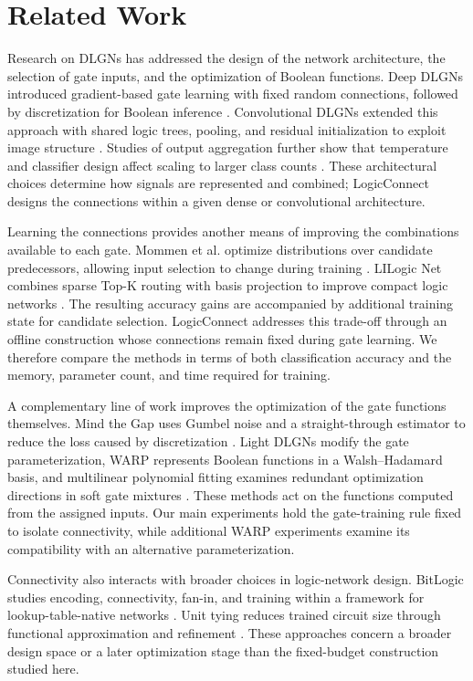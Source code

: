 \section{Related Work}

Research on DLGNs has addressed the design of the network architecture, the selection of gate inputs, and the optimization of Boolean functions. Deep DLGNs introduced gradient-based gate learning with fixed random connections, followed by discretization for Boolean inference \cite{petersen2022}. Convolutional DLGNs extended this approach with shared logic trees, pooling, and residual initialization to exploit image structure \cite{petersen2024}. Studies of output aggregation further show that temperature and classifier design affect scaling to larger class counts \cite{brandle2025}. These architectural choices determine how signals are represented and combined; LogicConnect designs the connections within a given dense or convolutional architecture.

Learning the connections provides another means of improving the combinations available to each gate. Mommen et al. optimize distributions over candidate predecessors, allowing input selection to change during training \cite{mommen2025}. LILogic Net combines sparse Top-K routing with basis projection to improve compact logic networks \cite{fojcik2026}. The resulting accuracy gains are accompanied by additional training state for candidate selection. LogicConnect addresses this trade-off through an offline construction whose connections remain fixed during gate learning. We therefore compare the methods in terms of both classification accuracy and the memory, parameter count, and time required for training.

A complementary line of work improves the optimization of the gate functions themselves. Mind the Gap uses Gumbel noise and a straight-through estimator to reduce the loss caused by discretization \cite{yousefi2025}. Light DLGNs modify the gate parameterization, WARP represents Boolean functions in a Walsh–Hadamard basis, and multilinear polynomial fitting examines redundant optimization directions in soft gate mixtures \cite{ruttgers2025,gerlach2026,kim2026}. These methods act on the functions computed from the assigned inputs. Our main experiments hold the gate-training rule fixed to isolate connectivity, while additional WARP experiments examine its compatibility with an alternative parameterization.

Connectivity also interacts with broader choices in logic-network design. BitLogic studies encoding, connectivity, fan-in, and training within a framework for lookup-table-native networks \cite{buehrer2026}. Unit tying reduces trained circuit size through functional approximation and refinement \cite{lee2026}. These approaches concern a broader design space or a later optimization stage than the fixed-budget construction studied here.
